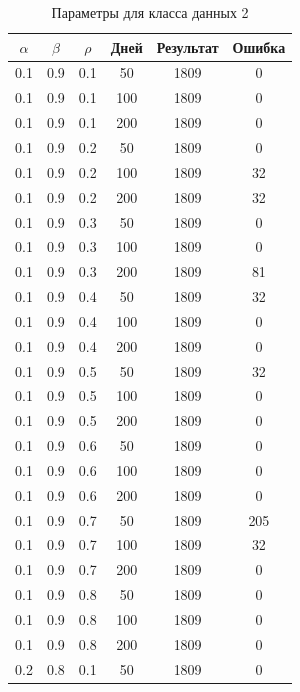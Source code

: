 \documentclass[a4paper,14pt, unknownkeysallowed]{extreport}
\begin{document}
\begin{center}
\captionsetup{justification=raggedright,singlelinecheck=off}
\begin{longtable}[c]{|c|c|c|c|c|c|}
\caption{Параметры для класса данных 2\label{tbl:table_kd2}}
		\\ \hline
		$\alpha$ & $\beta$ & $\rho$ & Дней & Результат & Ошибка 
		\\ \hline
		0.1 &  0.9 &  0.1 &   50 &  1809 &     0 \\
		0.1 &  0.9 &  0.1 &  100 &  1809 &     0 \\
		0.1 &  0.9 &  0.1 &  200 &  1809 &     0 \\
	   \hline
		0.1 &  0.9 &  0.2 &   50 &  1809 &     0 \\
		0.1 &  0.9 &  0.2 &  100 &  1809 &    32 \\
		0.1 &  0.9 &  0.2 &  200 &  1809 &    32 \\
	   \hline
		0.1 &  0.9 &  0.3 &   50 &  1809 &     0 \\
		0.1 &  0.9 &  0.3 &  100 &  1809 &     0 \\
		0.1 &  0.9 &  0.3 &  200 &  1809 &    81 \\
	   \hline
		0.1 &  0.9 &  0.4 &   50 &  1809 &    32 \\
		0.1 &  0.9 &  0.4 &  100 &  1809 &     0 \\
		0.1 &  0.9 &  0.4 &  200 &  1809 &     0 \\
	   \hline
		0.1 &  0.9 &  0.5 &   50 &  1809 &    32 \\
		0.1 &  0.9 &  0.5 &  100 &  1809 &     0 \\
		0.1 &  0.9 &  0.5 &  200 &  1809 &     0 \\
	   \hline
		0.1 &  0.9 &  0.6 &   50 &  1809 &     0 \\
		0.1 &  0.9 &  0.6 &  100 &  1809 &     0 \\
		0.1 &  0.9 &  0.6 &  200 &  1809 &     0 \\
	   \hline
		0.1 &  0.9 &  0.7 &   50 &  1809 &   205 \\
		0.1 &  0.9 &  0.7 &  100 &  1809 &    32 \\
		0.1 &  0.9 &  0.7 &  200 &  1809 &     0 \\
	   \hline
		0.1 &  0.9 &  0.8 &   50 &  1809 &     0 \\
		0.1 &  0.9 &  0.8 &  100 &  1809 &     0 \\
		0.1 &  0.9 &  0.8 &  200 &  1809 &     0 \\
	   \hline
		0.2 &  0.8 &  0.1 &   50 &  1809 &     0 \\

\end{longtable}
\end{center}
\end{document}
